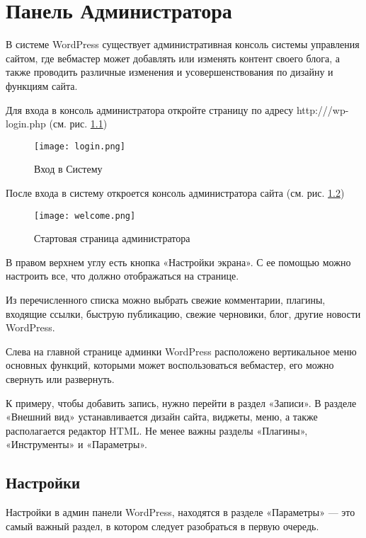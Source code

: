 \chapter{Панель Администратора}
\label{sec:chapter_admin}

В системе WordPress существует административная консоль системы управления сайтом, где вебмастер может добавлять или изменять контент своего блога, а также проводить различные изменения и усовершенствования по дизайну и функциям сайта.

Для входа в консоль администратора откройте страницу по адресу http://\MainDomain /wp-login.php (см. рис. \ref{fig:pic_Login})

\begin{figure}[htp]
    \centering
	\texttt{[image: login.png]}
    \caption{Вход в Систему}
    \label{fig:pic_Login}
\end{figure}


После входа в систему откроется консоль администратора сайта (см. рис. \ref{fig:pic_welcome})

\begin{figure}[htp]
    \centering
	\texttt{[image: welcome.png]}
    \caption{Стартовая страница администратора}
    \label{fig:pic_welcome}
\end{figure}

В правом верхнем углу есть кнопка «Настройки экрана». С ее помощью можно настроить все, что должно отображаться на странице.

Из перечисленного списка можно выбрать свежие комментарии, плагины, входящие ссылки, быструю публикацию, свежие черновики, блог, другие новости WordPress.

Слева на главной странице админки WordPress расположено вертикальное меню основных функций, которыми может воспользоваться вебмастер, его можно свернуть или развернуть.

К примеру, чтобы добавить запись, нужно перейти в раздел «Записи». В разделе «Внешний вид» устанавливается дизайн сайта, виджеты, меню, а также располагается редактор HTML. Не менее важны разделы «Плагины», «Инструменты» и «Параметры».

\section{Настройки}
\label{sec:part_wp_settings}

Настройки в админ панели WordPress, находятся в разделе «Параметры» — это самый важный раздел, в котором следует разобраться в первую очередь.

